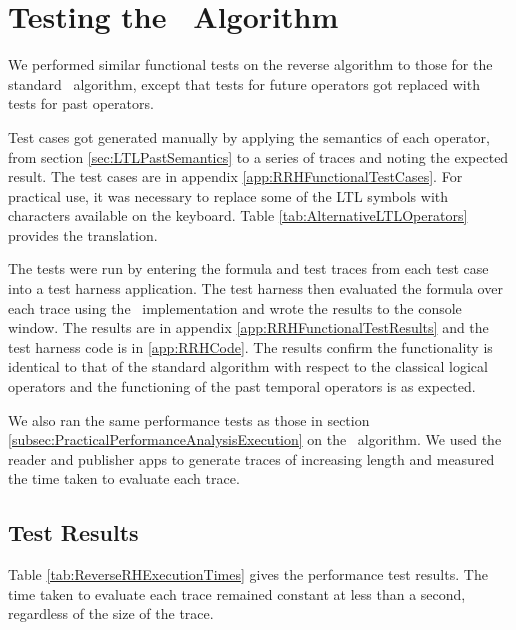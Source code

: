 \section{Testing the \RRH\ Algorithm}
\label{sec:Testing The Reverse Rosu-Havelund Algorithm}

We performed similar functional tests on the reverse algorithm to those for the standard \RH\ algorithm, except that tests for future operators got replaced with tests for past operators.

Test cases got generated manually by applying the semantics of each operator, from section \ref{sec:LTLPastSemantics} to a series of traces and noting the expected result.  The test cases are in appendix \ref{app:RRHFunctionalTestCases}.  For practical use, it was necessary to replace some of the LTL symbols with characters available on the keyboard.  Table \ref{tab:AlternativeLTLOperators} provides the translation.

The tests were run by entering the formula and test traces from each test case into a test harness application.  The test harness then evaluated the formula over each trace using the \RRH\ implementation and wrote the results to the console window.  The results are in appendix \ref{app:RRHFunctionalTestResults} and the test harness code is in \ref{app:RRHCode}.  The results confirm the functionality is identical to that of the standard algorithm with respect to the classical logical operators and the functioning of the past temporal operators is as expected.

We also ran the same performance tests as those in section \ref{subsec:PracticalPerformanceAnalysisExecution} on the \RRH\ algorithm.  We used the reader and publisher apps to generate traces of increasing length and measured the time taken to evaluate each trace.

\subsection{Test Results}
\label{subsec:PracticalPerformanceAnalysisResultsRRH}

Table \ref{tab:ReverseRHExecutionTimes} gives the performance test results.  The time taken to evaluate each trace remained constant at less than a second, regardless of the size of the trace.

